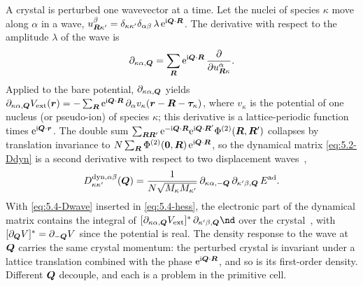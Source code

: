 A crystal is perturbed one wavevector at a time. Let the nuclei of species $\kappa$ move along $\alpha$ in a wave, $u^\beta_{\bm{R}\kappa'} = \delta_{\kappa\kappa'}\delta_{\alpha\beta}\,\lambda\,\mathrm{e}^{\mathrm{i}\bm{Q}\cdot\bm{R}}$. The derivative with respect to the amplitude $\lambda$ of the wave is
\begin{equation*}
  \partial_{\kappa\alpha,\bm{Q}} = \sum_{\bm{R}}\mathrm{e}^{\mathrm{i}\bm{Q}\cdot\bm{R}}\,\frac{\partial}{\partial u^\alpha_{\bm{R}\kappa}} .
\end{equation*}
Applied to the bare potential, $\partial_{\kappa\alpha,\bm{Q}}$ yields $\partial_{\kappa\alpha,\bm{Q}}V_{\mathrm{ext}}(\bm{r}) = -\sum_{\bm{R}}\mathrm{e}^{\mathrm{i}\bm{Q}\cdot\bm{R}}\,\partial_\alpha v_\kappa(\bm{r} - \bm{R} - \bm{\tau}_\kappa)$, where $v_\kappa$ is the potential of one nucleus (or pseudo-ion) of species $\kappa$; this derivative is a lattice-periodic function times $\mathrm{e}^{\mathrm{i}\bm{Q}\cdot\bm{r}}$. The double sum $\sum_{\bm{R}\bm{R}'}\mathrm{e}^{-\mathrm{i}\bm{Q}\cdot\bm{R}}\mathrm{e}^{\mathrm{i}\bm{Q}\cdot\bm{R}'}\Phi^{(2)}(\bm{R},\bm{R}')$ collapses by translation invariance to $N\sum_{\bm{R}}\Phi^{(2)}(\bm{0},\bm{R})\,\mathrm{e}^{\mathrm{i}\bm{Q}\cdot\bm{R}}$, so the dynamical matrix \cref{eq:5.2-Ddyn} is a second derivative with respect to two displacement waves~\cite[Eq.~(82)]{baroni2001phonons},
\begin{equation}
  D^{\mathrm{dyn},\alpha\beta}_{\kappa\kappa'}(\bm{Q}) = \frac{1}{N\sqrt{M_\kappa M_{\kappa'}}}\,\partial_{\kappa\alpha,-\bm{Q}}\,\partial_{\kappa'\beta,\bm{Q}}\,E^{\mathrm{ad}} .
  \label{eq:5.4-Dwave}
\end{equation}
With \cref{eq:5.4-Dwave} inserted in \cref{eq:5.4-hess}, the electronic part of the dynamical matrix contains the integral of $[\partial_{\kappa\alpha,\vect{Q}}V_{\mathrm{ext}}]^*\,\partial_{\kappa'\beta,\vect{Q}}\nd$ over the crystal~\cite[Eq.~(86)]{baroni2001phonons}, with $[\partial_{\bm{Q}}V]^* = \partial_{-\bm{Q}}V$ since the potential is real. The density response to the wave at $\bm{Q}$ carries the same crystal momentum: the perturbed crystal is invariant under a lattice translation combined with the phase $\mathrm{e}^{\mathrm{i}\bm{Q}\cdot\bm{R}}$, and so is its first-order density. Different $\bm{Q}$ decouple, and each is a problem in the primitive cell.

